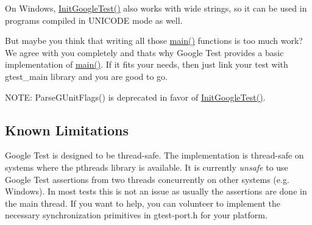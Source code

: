 On Windows, {\ttfamily \mbox{\hyperlink{namespacetesting_afd726ae08c9bd16dc52f78c822d9946b}{Init\+Google\+Test()}}} also works with wide strings, so it can be used in programs compiled in {\ttfamily U\+N\+I\+C\+O\+DE} mode as well.

But maybe you think that writing all those \mbox{\hyperlink{3_814_83_2CompilerIdC_2CMakeCCompilerId_8c_a0ddf1224851353fc92bfbff6f499fa97}{main()}} functions is too much work? We agree with you completely and that\textquotesingle{}s why Google Test provides a basic implementation of \mbox{\hyperlink{3_814_83_2CompilerIdC_2CMakeCCompilerId_8c_a0ddf1224851353fc92bfbff6f499fa97}{main()}}. If it fits your needs, then just link your test with gtest\+\_\+main library and you are good to go.

N\+O\+TE\+: {\ttfamily Parse\+G\+Unit\+Flags()} is deprecated in favor of {\ttfamily \mbox{\hyperlink{namespacetesting_afd726ae08c9bd16dc52f78c822d9946b}{Init\+Google\+Test()}}}.

\subsection*{Known Limitations}


\begin{DoxyItemize}
\item Google Test is designed to be thread-\/safe. The implementation is thread-\/safe on systems where the {\ttfamily pthreads} library is available. It is currently {\itshape unsafe} to use Google Test assertions from two threads concurrently on other systems (e.\+g. Windows). In most tests this is not an issue as usually the assertions are done in the main thread. If you want to help, you can volunteer to implement the necessary synchronization primitives in {\ttfamily gtest-\/port.\+h} for your platform. 
\end{DoxyItemize}